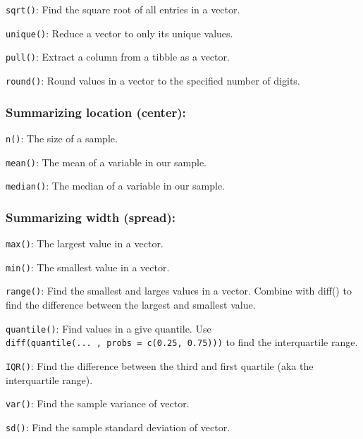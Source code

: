 \documentclass[
]{article}
\begin{document}
\texttt{sqrt()}: Find the square root of all entries in a vector.

\texttt{unique()}: Reduce a vector to only its unique values.

\texttt{pull()}: Extract a column from a tibble as a vector.

\texttt{round()}: Round values in a vector to the specified number of
digits.

\hypertarget{summarizing-location-center}{%
\subsubsection{Summarizing location
(center):}\label{summarizing-location-center}}

\texttt{n()}: The size of a sample.

\texttt{mean()}: The mean of a variable in our sample.

\texttt{median()}: The median of a variable in our sample.

\hypertarget{summarizing-width-spread}{%
\subsubsection{Summarizing width
(spread):}\label{summarizing-width-spread}}

\texttt{max()}: The largest value in a vector.

\texttt{min()}: The smallest value in a vector.

\texttt{range()}: Find the smallest and larges values in a vector.
Combine with diff() to find the difference between the largest and
smallest value.

\texttt{quantile()}: Find values in a give quantile. Use
\texttt{diff(quantile(...\ ,\ probs\ =\ c(0.25,\ 0.75)))} to find the
interquartile range.

\texttt{IQR()}: Find the difference between the third and first quartile
(aka the interquartile range).

\texttt{var()}: Find the sample variance of vector.

\texttt{sd()}: Find the sample standard deviation of vector.
\end{document}
